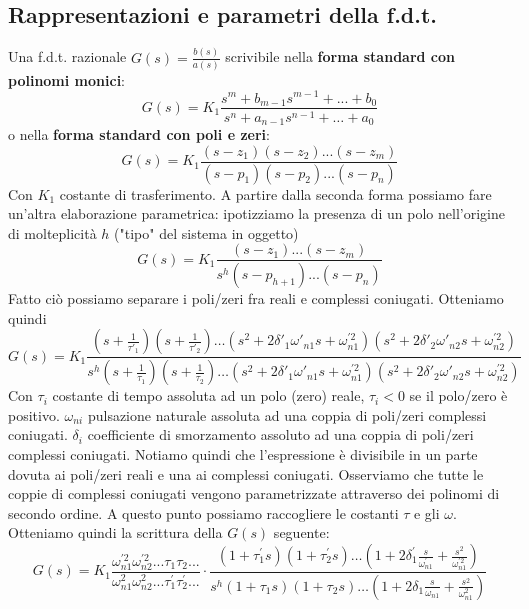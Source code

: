 \documentclass[11pt]{article}
\begin{document}
\subsection{Rappresentazioni e parametri della f.d.t.}
Una f.d.t. razionale $G(s)=\frac{b(s)}{a(s)}$ scrivibile nella \textbf{forma standard con polinomi monici}:
\begin{displaymath}
    G(s)=K_1\frac{s^m+b_{m-1}s^{m-1}+...+b_0}{s^n+a_{n-1}s^{n-1}+\dots+a_0}
\end{displaymath}
o nella \textbf{forma standard con poli e zeri}:\begin{displaymath}
    G(s)=K_1\frac{(s-z_1)(s-z_2)...(s-z_m)}{(s-p_1)(s-p_2)...(s-p_n)}
\end{displaymath}
Con $K_1$ costante di trasferimento. A partire dalla seconda forma possiamo fare un'altra elaborazione parametrica: ipotizziamo la presenza di un polo nell'origine di molteplicità $h$ ("tipo" del sistema in oggetto)
\begin{displaymath}
    G(s)=K_1\frac{(s-z_1)...(s-z_m)}{s^h(s-p_{h+1})...(s-p_n)}
\end{displaymath}
Fatto ciò possiamo separare i poli/zeri fra reali e complessi coniugati. Otteniamo quindi
\begin{displaymath}
    G(s) = K_1\frac{\left(s+\frac{1}{\tau'_1}\right)\left(s+\frac{1}{\tau'_2}\right)\dots(s^2+2\delta'_1\omega'_{n1}s + \omega^{'2}_{n1})(s^2+2\delta'_2\omega'_{n2}s + \omega^{'2}_{n2})}{s^h\left(s+\frac{1}{\tau_1}\right)\left(s+\frac{1}{\tau_2}\right)\dots(s^2+2\delta'_1\omega'_{n1}s + \omega^{'2}_{n1})(s^2+2\delta'_2\omega'_{n2}s + \omega^{'2}_{n2})}
\end{displaymath}
Con $\tau_i$ costante di tempo assoluta ad un polo (zero) reale, $\tau_i<0$ se il polo/zero è positivo. $\omega_{ni}$ pulsazione naturale assoluta ad una coppia di poli/zeri complessi coniugati. $\delta_i$ coefficiente di smorzamento assoluto ad una coppia di poli/zeri complessi coniugati. Notiamo quindi che l'espressione è divisibile in un parte dovuta ai poli/zeri reali e una ai complessi coniugati. Osserviamo che tutte le coppie di complessi coniugati vengono parametrizzate attraverso dei polinomi di secondo ordine. A questo punto possiamo raccogliere le costanti $\tau$ e gli $\omega$. Otteniamo quindi la scrittura della $G(s)$ seguente:
\begin{displaymath}
    G(s)=K_1\frac{\omega^{'2}_{n1}\omega^{'2}_{n2}...\tau_1\tau_2...}{\omega^{2}_{n1}\omega^{2}_{n2}...\tau_1^{'}\tau_2^{'}...} \cdot \frac{(1+\tau_1^{'}s)(1+\tau_2^{'}s)\dots\left(1+2\delta^{'}_1 \frac{s}{\omega^{'}_{n1}}+\frac{s^2}{\omega^{'2}_{n1}}\right)}{s^h(1+\tau_1s)(1+\tau_2s)\dots\left(1+2\delta_1 \frac{s}{\omega_{n1}}+\frac{s^2}{\omega^{2}_{n1}}\right)}
\end{displaymath}
\end{document}
